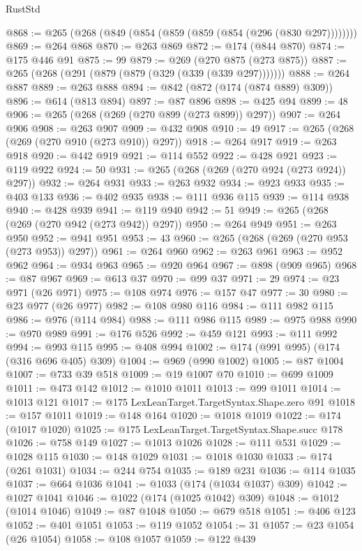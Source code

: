 \begin{lexlean}{RustStd}
\begin{coremodule}
@868 := @265 (@268 (@849 (@854 (@859 (@859 (@854 (@296 (@830 @297))))))))
@869 := @264 @868
@870 := @263 @869
@872 := @174 (@844 @870)
@874 := @175 @446 @91
@875 := 99
@879 := @269 (@270 @875 (@273 @875))
@887 := @265 (@268 (@291 (@879 (@879 (@329 (@339 (@339 @297)))))))
@888 := @264 @887
@889 := @263 @888
@894 := @842 (@872 (@174 (@874 @889) @309))
@896 := @614 (@813 @894)
@897 := @87 @896
@898 := @425 @94
@899 := 48
@906 := @265 (@268 (@269 (@270 @899 (@273 @899)) @297))
@907 := @264 @906
@908 := @263 @907
@909 := @432 @908
@910 := 49
@917 := @265 (@268 (@269 (@270 @910 (@273 @910)) @297))
@918 := @264 @917
@919 := @263 @918
@920 := @442 @919
@921 := @114 @552
@922 := @428 @921
@923 := @119 @922
@924 := 50
@931 := @265 (@268 (@269 (@270 @924 (@273 @924)) @297))
@932 := @264 @931
@933 := @263 @932
@934 := @923 @933
@935 := @403 @133
@936 := @402 @935
@938 := @111 @936 @115
@939 := @114 @938
@940 := @428 @939
@941 := @119 @940
@942 := 51
@949 := @265 (@268 (@269 (@270 @942 (@273 @942)) @297))
@950 := @264 @949
@951 := @263 @950
@952 := @941 @951
@953 := 43
@960 := @265 (@268 (@269 (@270 @953 (@273 @953)) @297))
@961 := @264 @960
@962 := @263 @961
@963 := @952 @962
@964 := @934 @963
@965 := @920 @964
@967 := @898 (@909 @965)
@968 := @87 @967
@969 := @613 @37
@970 := @99 @37
@971 := 29
@974 := @23 @971 (@26 @971)
@975 := @108 @974
@976 := @157 @47
@977 := 30
@980 := @23 @977 (@26 @977)
@982 := @108 @980 @116
@984 := @111 @982 @115
@986 := @976 (@114 @984)
@988 := @111 @986 @115
@989 := @975 @988
@990 := @970 @989
@991 := @176 @526
@992 := @459 @121
@993 := @111 @992
@994 := @993 @115
@995 := @408 @994
@1002 := @174 (@991 @995) (@174 (@316 @696 @405) @309)
@1004 := @969 (@990 @1002)
@1005 := @87 @1004
@1007 := @733 @39 @518
@1009 := @19 @1007 @70
@1010 := @699 @1009
@1011 := @473 @142
@1012 := @1010 @1011
@1013 := @99 @1011
@1014 := @1013 @121
@1017 := @175 LexLeanTarget.TargetSyntax.Shape.zero @91
@1018 := @157 @1011
@1019 := @148 @164
@1020 := @1018 @1019
@1022 := @174 (@1017 @1020)
@1025 := @175 LexLeanTarget.TargetSyntax.Shape.succ @178
@1026 := @758 @149
@1027 := @1013 @1026
@1028 := @111 @531
@1029 := @1028 @115
@1030 := @148 @1029
@1031 := @1018 @1030
@1033 := @174 (@261 @1031)
@1034 := @244 @754
@1035 := @189 @231
@1036 := @114 @1035
@1037 := @664 @1036
@1041 := @1033 (@174 (@1034 @1037) @309)
@1042 := @1027 @1041
@1046 := @1022 (@174 (@1025 @1042) @309)
@1048 := @1012 (@1014 @1046)
@1049 := @87 @1048
@1050 := @679 @518
@1051 := @406 @123
@1052 := @401 @1051
@1053 := @119 @1052
@1054 := 31
@1057 := @23 @1054 (@26 @1054)
@1058 := @108 @1057
@1059 := @122 @439

\end{coremodule}
\end{lexlean}

